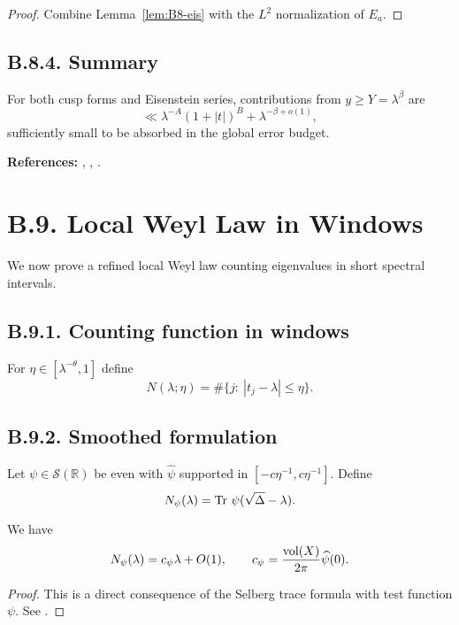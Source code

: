 \begin{proof}
Combine Lemma~\ref{lem:B8-eis} with the $L^2$ normalization of $E_a$.
\end{proof}

\subsection*{B.8.4. Summary}

\begin{corollary}\label{cor:B8}
For both cusp forms and Eisenstein series, contributions from $y\ge Y=\lambda^\beta$ are
\[
\ll \lambda^{-A}(1+|t|)^B+\lambda^{-\beta+o(1)},
\]
sufficiently small to be absorbed in the global error budget.
\end{corollary}

\medskip
\noindent\textbf{References:} \cite{HejhalI}, \cite{HejhalII}, \cite{IwaniecKowalski}.

\section{B.9. Local Weyl Law in Windows}\label{sec:B9}

We now prove a refined local Weyl law counting eigenvalues in short spectral intervals.

\subsection*{B.9.1. Counting function in windows}

For $\eta\in[\lambda^{-\theta},1]$ define
\[
N(\lambda;\eta)=\#\{j:\ |t_j-\lambda|\le \eta\}.
\]

\subsection*{B.9.2. Smoothed formulation}

Let $\psi\in\mathcal{S}(\mathbb{R})$ be even with $\widehat{\psi}$ supported in $[-c\eta^{-1},c\eta^{-1}]$.
Define
\[
N_\psi(\lambda)=\operatorname{Tr}\,\psi(\sqrt{\Delta}-\lambda).
\]

\begin{lemma}\label{lem:B9-smooth}
We have
\[
N_\psi(\lambda)=c_\psi\lambda+O(1),
\qquad
c_\psi=\frac{\operatorname{vol}(X)}{2\pi}\widehat{\psi}(0).
\]
\end{lemma}

\begin{proof}
This is a direct consequence of the Selberg trace formula with test function $\psi$.
See \cite{HejhalI}.
\end{proof}

